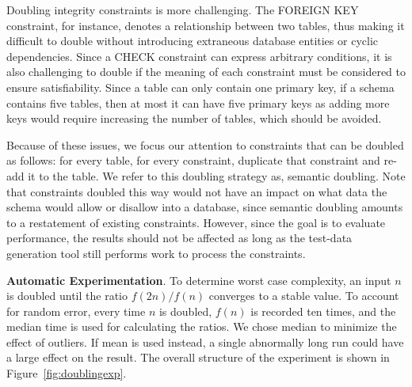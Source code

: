 

  Doubling integrity constraints is more challenging.  The FOREIGN KEY constraint, for instance, denotes a relationship
  between two tables, thus making it difficult to double without introducing extraneous database entities or cyclic
  dependencies.  Since a CHECK constraint can express arbitrary conditions, it is also challenging to double if the
  meaning of each constraint must be considered to ensure satisfiability.  Since a table can only contain one primary
  key, if a schema contains five tables, then at most it can have five primary keys as adding more keys would require
  increasing the number of tables, which should be avoided.


  Because of these issues, we focus our attention to constraints that can be doubled as follows: for every table, for
  every constraint, duplicate that constraint and re-add it to the table.  We refer to this doubling strategy as,
  semantic doubling.  Note that constraints doubled this way would not have an impact on what data the schema would
  allow or disallow into a database, since semantic doubling amounts to a restatement of existing constraints.  However,
  since the goal is to evaluate performance, the results should not be affected as long as the test-data generation tool
  still performs work to process the constraints.


  \textbf{Automatic Experimentation}. To determine worst case complexity, an input $n$ is doubled until the ratio $f(2n)
  / f(n)$ converges to a stable value.  To account for random error, every time $n$ is doubled, $f(n)$ is recorded ten
  times, and the median time is used for calculating the ratios.  We chose median to minimize the effect of outliers. If
  mean is used instead, a single abnormally long run could have a large effect on the result. The overall structure of
  the experiment is shown in Figure~\ref{fig:doublingexp}.

